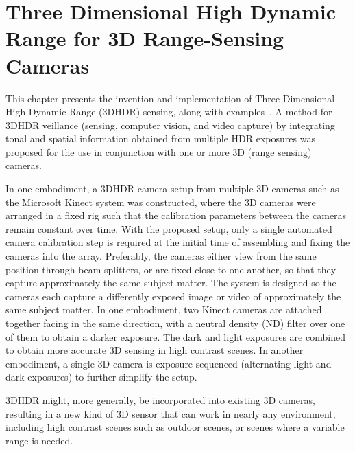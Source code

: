 \chapter{Three Dimensional High Dynamic Range for 3D Range-Sensing Cameras}
\label{3dhdr3dsensing}

This chapter presents the invention and implementation of Three Dimensional High Dynamic Range (3DHDR) sensing, along with examples~\cite{lo2013three}. A method for 3DHDR veillance (sensing, computer vision, and video capture) by integrating tonal and spatial information obtained from multiple HDR exposures was proposed for the use in conjunction with one or more 3D (range sensing) cameras.

In one embodiment, a 3DHDR camera setup from multiple 3D cameras such as the Microsoft Kinect system was constructed, where the 3D cameras were arranged in a fixed rig such that the calibration parameters between the cameras remain constant over time. With the proposed setup, only a single automated camera calibration step is required at the initial time of assembling and fixing the cameras into the array.  Preferably, the cameras either view from the same position through beam splitters, or are fixed close to one another, so that they capture approximately the same subject matter. The system is designed so the cameras each capture a differently exposed image or video of approximately the same subject matter.  In one embodiment, two Kinect cameras are attached together facing in the same direction, with a neutral density (ND) filter over one of them to obtain a darker exposure.  The dark and light exposures are combined to obtain more accurate 3D sensing in high contrast scenes.  In another embodiment, a single 3D camera is exposure-sequenced (alternating light and dark exposures) to further simplify the setup.

3DHDR might, more generally, be incorporated into existing 3D cameras, resulting in a new kind of 3D sensor that can work in nearly any environment, including high contrast scenes such as outdoor scenes, or scenes where a variable range is needed.

